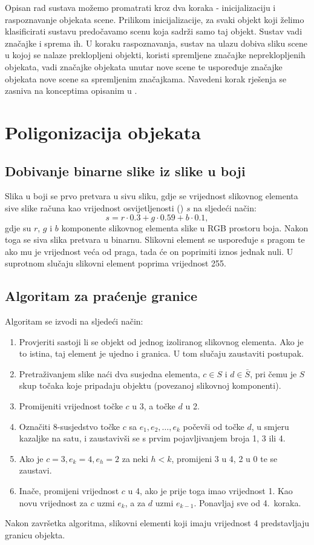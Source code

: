 \documentclass[lmodern, utf8, seminar, numeric]{fer}
\begin{document}
Opisan rad sustava možemo promatrati kroz dva koraka - inicijalizaciju i raspoznavanje objekata scene. Prilikom inicijalizacije, za svaki objekt koji želimo klasificirati sustavu predočavamo scenu koja sadrži samo taj objekt. Sustav vadi značajke i sprema ih. U koraku raspoznavanja, sustav na ulazu dobiva sliku scene u kojoj se nalaze preklopljeni objekti, koristi spremljene značajke nepreklopljenih objekata, vadi značajke objekata unutar nove scene te uspoređuje značajke objekata nove scene sa spremljenim značajkama. Navedeni korak rješenja se zasniva na konceptima opisanim u \citep{ayache2009hyper}.

\section{Poligonizacija objekata}

\subsection{Dobivanje binarne slike iz slike u boji}
Slika u boji se prvo pretvara u sivu sliku, gdje se vrijednost slikovnog elementa sive slike računa kao vrijednost osvijetljenosti ()  $s$ na sljedeći način:
$$s = r \cdot 0.3 + g \cdot 0.59 + b \cdot 0.1,$$
gdje su $r$, $g$ i $b$ komponente slikovnog elementa slike u RGB prostoru boja. Nakon toga se siva slika pretvara u binarnu. Slikovni element se uspoređuje s pragom te ako mu je vrijednost veća od praga, tada će on poprimiti iznos jednak nuli. U suprotnom slučaju slikovni element poprima vrijednost 255.

\subsection{Algoritam za praćenje granice}
Algoritam se izvodi na sljedeći način:
\begin{enumerate}
  \item Provjeriti sastoji li se objekt od jednog izoliranog slikovnog elementa. Ako je to istina, taj element je ujedno i granica. U tom slučaju zaustaviti postupak.
  \item Pretraživanjem slike naći dva susjedna elementa, $c \in S$ i $d \in \bar S$, pri čemu je $S$ skup točaka koje pripadaju objektu (povezanoj slikovnoj komponenti).
  \item Promijeniti vrijednost točke $c$ u 3, a točke $d$ u 2.
  \item Označiti 8-susjedstvo točke $c$ sa $e_1, e_2, \ldots ,e_k$ počevši od točke $d$, u smjeru kazaljke na satu, i zaustavivši se s prvim pojavljivanjem broja 1, 3 ili 4.
  \item Ako je $c=3, e_k=4, e_h=2$ za neki $h<k$, promijeni 3 u 4, 2 u 0 te se zaustavi.
  \item Inače, promijeni vrijednost $c$ u 4, ako je prije toga imao vrijednost 1. Kao novu vrijednost za $c$ uzmi $e_k$, a za $d$ uzmi $e_{k-1}$. Ponavljaj sve od 4.\ koraka.
\end{enumerate}
Nakon završetka algoritma, slikovni elementi koji imaju vrijednost 4 predstavljaju granicu objekta.
\end{document}
